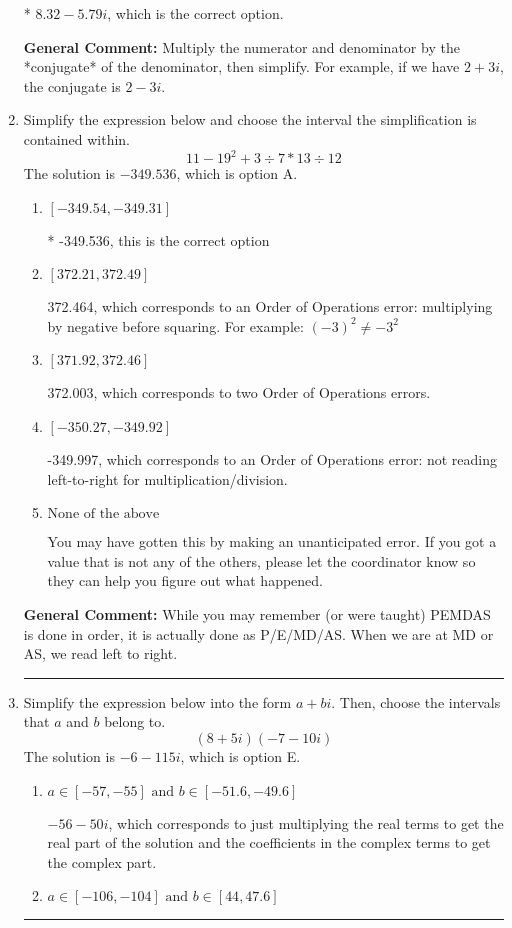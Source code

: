 \documentclass{extbook}[14pt]
\newcommand{\litem}[1]{\item #1

\rule{\textwidth}{0.4pt}}
\begin{document}
\begin{enumerate}
{\begin{enumerate}[label=\Alph*.]
* $8.32  - 5.79 i$, which is the correct option.
\end{enumerate}

\textbf{General Comment:} Multiply the numerator and denominator by the *conjugate* of the denominator, then simplify. For example, if we have $2+3i$, the conjugate is $2-3i$.
}
\litem{
Simplify the expression below and choose the interval the simplification is contained within.
\[ 11 - 19^2 + 3 \div 7 * 13 \div 12 \]The solution is \( -349.536 \), which is option A.\begin{enumerate}[label=\Alph*.]
\item \( [-349.54, -349.31] \)

* -349.536, this is the correct option
\item \( [372.21, 372.49] \)

 372.464, which corresponds to an Order of Operations error: multiplying by negative before squaring. For example: $(-3)^2 \neq -3^2$
\item \( [371.92, 372.46] \)

 372.003, which corresponds to two Order of Operations errors.
\item \( [-350.27, -349.92] \)

 -349.997, which corresponds to an Order of Operations error: not reading left-to-right for multiplication/division.
\item \( \text{None of the above} \)

 You may have gotten this by making an unanticipated error. If you got a value that is not any of the others, please let the coordinator know so they can help you figure out what happened.
\end{enumerate}

\textbf{General Comment:} While you may remember (or were taught) PEMDAS is done in order, it is actually done as P/E/MD/AS. When we are at MD or AS, we read left to right.
}
\litem{
Simplify the expression below into the form $a+bi$. Then, choose the intervals that $a$ and $b$ belong to.
\[ (8 + 5 i)(-7 - 10 i) \]The solution is \( -6 - 115 i \), which is option E.\begin{enumerate}[label=\Alph*.]
\item \( a \in [-57, -55] \text{ and } b \in [-51.6, -49.6] \)

 $-56 - 50 i$, which corresponds to just multiplying the real terms to get the real part of the solution and the coefficients in the complex terms to get the complex part.
\item \( a \in [-106, -104] \text{ and } b \in [44, 47.6] \)


\end{enumerate}}
\end{enumerate}
\end{document}
